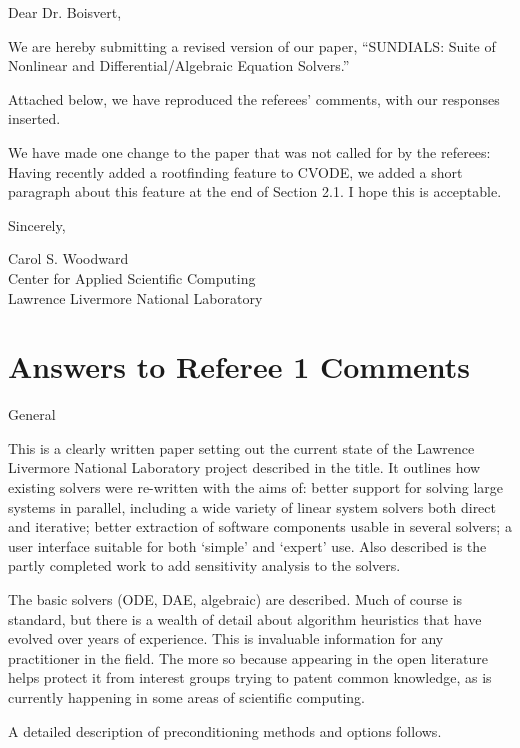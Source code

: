 \documentclass[12pt]{letter}
\begin{document}
\begin{letter}



\opening{Dear Dr. Boisvert,}

We are hereby submitting a revised version of our paper, ``SUNDIALS:
Suite of Nonlinear and Differential/Algebraic Equation Solvers.''

Attached below, we have reproduced the referees' comments, with our
responses inserted.

We have made one change to the paper that was not called for by the
referees: Having recently added a rootfinding feature to CVODE, we
added a short paragraph about this feature at the end of Section 2.1.
I hope this is acceptable.


\closing{Sincerely,}

Carol S. Woodward\\
Center for Applied Scientific Computing\\
Lawrence Livermore National Laboratory

\end{letter}


\newpage
\section{Answers to Referee 1 Comments}

General 

This is a clearly written paper setting out the current state of the
Lawrence Livermore National Laboratory project described in the title.
It outlines how existing solvers were re-written with the aims of:
better support for solving large systems in parallel, including a wide
variety of linear system solvers both direct and iterative; better
extraction of software components usable in several solvers; a user
interface suitable for both `simple' and `expert' use. Also described
is the partly completed work to add sensitivity analysis to the
solvers. 

The basic solvers (ODE, DAE, algebraic) are described.  Much of course
is standard, but there is a wealth of detail about algorithm
heuristics that have evolved over years of experience. This is
invaluable information for any practitioner in the field. The more so
because appearing in the open literature helps protect it from
interest groups trying to patent common knowledge, as is currently
happening in some areas of scientific computing.

A detailed description of preconditioning methods and options follows. 
\end{document}
